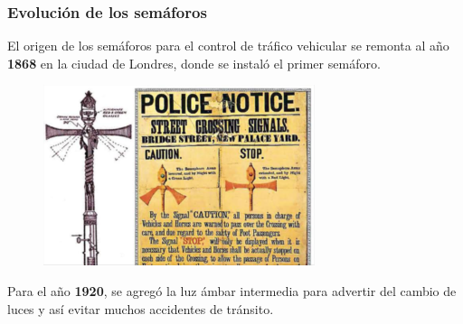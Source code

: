 \documentclass[
	11pt, %
]{beamer}
\begin{document}
\begin{frame}
  \frametitle{Evolución de los semáforos}
  \bigskip %

  El origen de los semáforos para el control de tráfico vehicular se remonta al año \textbf{1868} en la ciudad de Londres, donde se instaló el primer semáforo. \\

  \begin{figure}
    \includegraphics[width=0.3\linewidth]{primer_semaforo.png}
  \end{figure}
  
  Para el año \textbf{1920}, se agregó la luz ámbar intermedia para advertir del cambio de luces y así evitar muchos accidentes de tránsito.\\
\end{frame}
\end{document}
